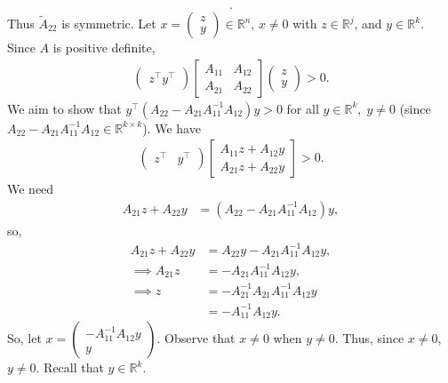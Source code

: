 \documentclass{report}
\begin{document}
\begin{remark}
\begin{align*}
    .\end{align*}
    Thus $\tilde{A}_{22}$ is symmetric.
    \bigbreak \noindent 
    Let $x = \begin{pmatrix} z \\ y \end{pmatrix} \in \mathbb{R}^{n}$, $x \ne 0$ with $z \in \mathbb{R}^{j}$, and $y \in \mathbb{R}^{k}$. Since $A$ is positive definite,
    \begin{align*}
        \begin{pmatrix} z^{\top} y^{\top} \end{pmatrix} \begin{bmatrix}
        A_{11} & A_{12} \\
        A_{21} & A_{22}
        \end{bmatrix}
        \begin{pmatrix} z \\ y \end{pmatrix} > 0
    .\end{align*}
    We aim to show that $y^{\top}(A_{22} - A_{21}A_{11}^{-1}A_{12})y >0 $ for all $y \in \mathbb{R}^{k},\; y\ne 0$ (since $A_{22} - A_{21}A_{11}^{-1}A_{12} \in \mathbb{R}^{k\times k} $). 
    \bigbreak \noindent 
    We have
    \begin{align*}
        \begin{pmatrix} z^{\top} & y^{\top} \end{pmatrix} \begin{bmatrix} A_{11}z + A_{12}y \\ A_{21}z + A_{22}y \end{bmatrix} > 0
    .\end{align*}
    We need 
    \begin{align*}
        A_{21}z + A_{22}y  &= (A_{22} - A_{21}A_{11}^{-1}A_{12})y,
    \end{align*}
    so,
    \begin{align*}
        A_{21}z + A_{22} y &= A_{22}y - A_{21}A_{11}^{-1}A_{12}y,\\
        \implies A_{21}z &= -A_{21}A_{11}^{-1}A_{12}y, \\
        \implies z &= -A_{21}^{-1}A_{21}A_{11}^{-1}A_{12}y \\
                   &= -A_{11}^{-1}A_{12}y
    .\end{align*}
    So, let $x = \begin{pmatrix} -A_{11}^{-1}A_{12}y \\ y \end{pmatrix} $. Observe that $x \ne 0$ when $y\ne 0$. Thus, since $x \ne 0$, $y\ne 0$. Recall that $y \in \mathbb{R}^{k} $.

\end{remark}
\end{document}
